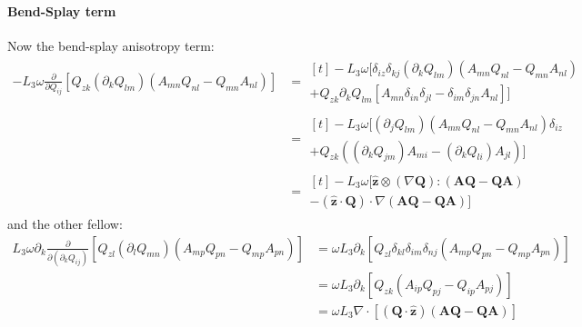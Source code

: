\documentclass[reqno]{article}
\newcommand{\Q}{\mathbf{Q}}
\newcommand{\A}{\mathbf{A}}
\newcommand{\z}{\mathbf{\hat{z}}}
\begin{document}
\paragraph{Bend-Splay term}

Now the bend-splay anisotropy term:
\begin{equation}
\begin{split}
    -L_3 \omega \frac{\partial}{\partial Q_{ij}} \left[
        Q_{zk} (\partial_{k} Q_{lm}) \left( A_{mn} Q_{nl} - Q_{mn} A_{nl} \right)
    \right]
    &=
    \begin{multlined}[t]
        -L_3 \omega \biggl[
            \delta_{iz} \delta_{kj} (\partial_k Q_{lm})
            \left( A_{mn} Q_{nl} - Q_{mn} A_{nl} \right) \\
            + 
            Q_{zk} \partial_k Q_{lm} \left[
                A_{mn} \delta_{in} \delta_{jl} - \delta_{im} \delta_{jn} A_{nl}
            \right]
        \biggr]
    \end{multlined} \\
    &=
    \begin{multlined}[t]
        -L_3 \omega \biggl[
            (\partial_j Q_{lm}) \left( A_{mn} Q_{nl} - Q_{mn} A_{nl} \right) \delta_{iz} \\
            +
            Q_{zk} \left(
                (\partial_k Q_{jm}) A_{mi}
                - (\partial_k Q_{li}) A_{jl}
            \right)
        \biggr]
    \end{multlined} \\
    &=
    \begin{multlined}[t]
        -L_3 \omega \biggl[
            \z \otimes \left( \nabla \Q \right) : \left( \A \Q - \Q \A \right) \\
            - \left( \z \cdot \Q \right) \cdot \nabla \left( \A \Q - \Q \A \right)
        \biggr]
    \end{multlined}
\end{split}
\end{equation}
and the other fellow:
\begin{equation}
\begin{split}
    L_3 \omega \partial_k \frac{\partial}{\partial (\partial_k Q_{ij})} \left[
        Q_{zl} (\partial_l Q_{mn}) \left(
            A_{mp} Q_{pn} - Q_{mp} A_{pn}
        \right)
    \right]
    &=
    \omega L_3 \partial_k \left[
        Q_{zl} \delta_{kl} \delta_{im} \delta_{nj} \left(
            A_{mp} Q_{pn} - Q_{mp} A_{pn}
        \right)
    \right] \\
    &=
    \omega L_3 \partial_k \left[
        Q_{zk} \left(
            A_{ip} Q_{pj} - Q_{ip} A_{pj}
        \right)
    \right] \\
    &=
    \omega L_3 \nabla \cdot \left[
        \left( \Q \cdot \z \right)
        \left( \A \Q - \Q \A \right)
    \right]
\end{split}
\end{equation}
\end{document}
